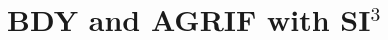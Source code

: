 \documentclass[../main/SI3_manual]{subfiles}
\begin{document}

\chapter{BDY and AGRIF with SI$^3$}
\label{chap:REG}
\chaptertoc

\newpage
$\ $\newline    %
\end{document}
